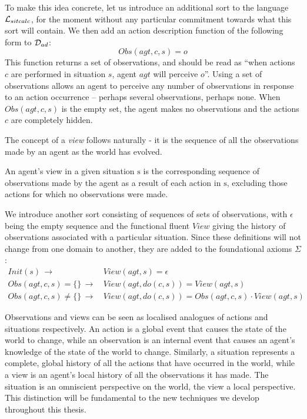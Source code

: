 To make this idea concrete, let us introduce an additional sort 
to the language $\mathcal{L}_{sitcalc}$, for the moment without any
particular commitment towards what this sort will contain. We then
add an action description function of the following form to $\mathcal{D}_{ad}$:\[
Obs(agt,c,s)=o\]
 This function returns a set of observations, and should be read as
{}``when actions $c$ are performed in situation $s$, agent $agt$
will perceive $o$''. Using a set of observations allows an agent
to perceive any number of observations in response to an action occurrence
-- perhaps several observations, perhaps none. When $Obs(agt,c,s)$
is the empty set, the agent makes no observations and the actions
$c$ are completely hidden.

The concept of a \emph{view} follows naturally - it is the sequence
of all the observations made by an agent as the world has evolved.

\begin{defnL}
[{Views}] An agent's view in a given situation $\mathrm{s}$
is the corresponding sequence of observations made by the agent as
a result of each action in $\mathrm{s}$, excluding those actions
for which no observations were made. \label{defn:Observations:View} 
\end{defnL}
We introduce another sort  consisting of sequences of sets
of observations, with $\epsilon$ being the empty sequence and the
functional fluent $View$ giving the history of observations associated
with a particular situation. Since these definitions will not change
from one domain to another, they are added to the foundational axioms
$\Sigma$:\begin{align}
Init(s)\,\rightarrow & \, View(agt,s)=\epsilon\nonumber \\
Obs(agt,c,s)=\{\}\,\rightarrow & \, View(agt,do(c,s))=View(agt,s)\nonumber \\
Obs(agt,c,s)\neq\{\}\,\rightarrow & \, View(agt,do(c,s))=Obs(agt,c,s)\cdot View(agt,s)\label{eq:view_defn}\end{align}


Observations and views can be seen as localised analogues of actions
and situations respectively. An action is a global event that causes
the state of the world to change, while an observation is an internal
event that causes an agent's knowledge of the state of the world to
change. Similarly, a situation represents a complete, global history
of all the actions that have occurred in the world, while a view is
an agent's local history of all the observations it has made. The
situation is an omniscient perspective on the world, the view a local
perspective. This distinction will be fundamental to the new techniques
we develop throughout this thesis.

